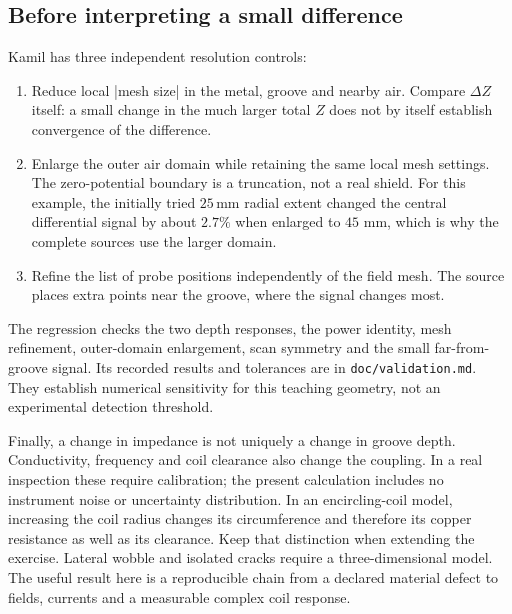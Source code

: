 \subsection{Before interpreting a small difference}
Kamil has three independent resolution controls:
\begin{enumerate}
\item Reduce local |mesh size| in the metal, groove and nearby air. Compare
$\Delta Z$ itself: a small change in the much larger total $Z$ does not by
itself establish convergence of the difference.
\item Enlarge the outer air domain while retaining the same local mesh
settings. The zero-potential boundary is a truncation, not a real shield.
For this example, the initially tried $25\,\mathrm{mm}$ radial extent changed
the central differential signal by about $2.7\%$ when enlarged to $45$ mm,
which is why the complete sources use the larger domain.
\item Refine the list of probe positions independently of the field mesh.
The source places extra points near the groove, where the signal changes most.
\end{enumerate}
The regression checks the two depth responses, the power
identity, mesh refinement, outer-domain enlargement, scan symmetry and the
small far-from-groove signal. Its recorded results and tolerances are in
\nolinkurl{doc/validation.md}. They establish numerical sensitivity for this
teaching geometry, not an experimental detection threshold.

Finally, a change in impedance is not uniquely a change in groove depth.
Conductivity, frequency and coil clearance also change the coupling. In a
real inspection these require calibration; the present calculation includes
no instrument noise or uncertainty distribution. In an encircling-coil model,
increasing the coil radius changes its circumference and therefore its copper
resistance as well as its clearance. Keep that distinction when extending the
exercise. Lateral wobble and isolated cracks require a three-dimensional model.
The useful result here is a reproducible chain from a declared material defect
to fields, currents and a measurable complex coil response.

\clearpage
